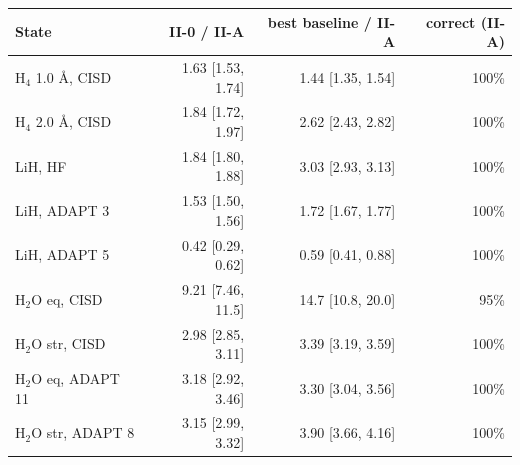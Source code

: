 \begin{tabular}{@{}lrrr@{}}
\toprule
State & II-0 / II-A & best baseline / II-A & correct (II-A) \\
\midrule
H$_4$ 1.0 \AA, CISD & 1.63 [1.53, 1.74] & 1.44 [1.35, 1.54] & 100\% \\
H$_4$ 2.0 \AA, CISD & 1.84 [1.72, 1.97] & 2.62 [2.43, 2.82] & 100\% \\
LiH, HF & 1.84 [1.80, 1.88] & 3.03 [2.93, 3.13] & 100\% \\
LiH, ADAPT 3 & 1.53 [1.50, 1.56] & 1.72 [1.67, 1.77] & 100\% \\
LiH, ADAPT 5 & 0.42 [0.29, 0.62] & 0.59 [0.41, 0.88] & 100\% \\
H$_2$O eq, CISD & 9.21 [7.46, 11.5] & 14.7 [10.8, 20.0] & 95\% \\
H$_2$O str, CISD & 2.98 [2.85, 3.11] & 3.39 [3.19, 3.59] & 100\% \\
H$_2$O eq, ADAPT 11 & 3.18 [2.92, 3.46] & 3.30 [3.04, 3.56] & 100\% \\
H$_2$O str, ADAPT 8 & 3.15 [2.99, 3.32] & 3.90 [3.66, 4.16] & 100\% \\
\bottomrule
\end{tabular}
